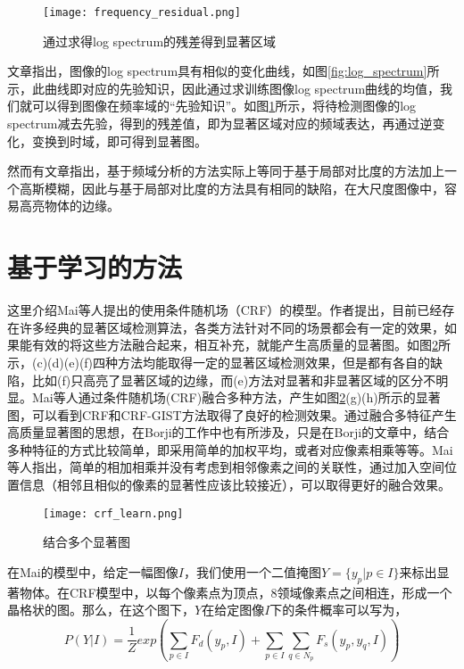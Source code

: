 \begin{figure}[t]
\centering
\texttt{[image: frequency\_residual.png]}
\caption{通过求得log spectrum的残差得到显著区域}\label{fig:frequency_residual}
\end{figure}

文章指出，图像的log spectrum具有相似的变化曲线，如图\ref{fig:log_spectrum}所示，此曲线即对应的先验知识，因此通过求训练图像log spectrum曲线的均值，我们就可以得到图像在频率域的“先验知识”。如图\ref{fig:frequency_residual}所示，将待检测图像的log spectrum减去先验，得到的残差值，即为显著区域对应的频域表达，再通过逆变化，变换到时域，即可得到显著图。

然而有文章\cite{hou2012image}指出，基于频域分析的方法实际上等同于基于局部对比度的方法加上一个高斯模糊，因此与基于局部对比度的方法具有相同的缺陷，在大尺度图像中，容易高亮物体的边缘。

\section{基于学习的方法}
这里介绍Mai等人\cite{maisaliency}提出的使用条件随机场（CRF）的模型。作者提出，目前已经存在许多经典的显著区域检测算法，各类方法针对不同的场景都会有一定的效果，如果能有效的将这些方法融合起来，相互补充，就能产生高质量的显著图。如图\ref{fig:crf_learn}所示，(c)(d)(e)(f)四种方法均能取得一定的显著区域检测效果，但是都有各自的缺陷，比如(f)只高亮了显著区域的边缘，而(e)方法对显著和非显著区域的区分不明显。Mai等人通过条件随机场(CRF)融合多种方法，产生如图\ref{fig:crf_learn}(g)(h)所示的显著图，可以看到CRF和CRF-GIST方法取得了良好的检测效果。通过融合多特征产生高质量显著图的思想，在Borji的工作中\cite{borji2012salient}也有所涉及，只是在Borji的文章中，结合多种特征的方式比较简单，即采用简单的加权平均，或者对应像素相乘等等。Mai等人指出\cite{maisaliency}，简单的相加相乘并没有考虑到相邻像素之间的关联性，通过加入空间位置信息（相邻且相似的像素的显著性应该比较接近），可以取得更好的融合效果。

\begin{figure}[h]
\centering
\texttt{[image: crf\_learn.png]}
\caption{结合多个显著图}\label{fig:crf_learn}
\end{figure}

在Mai的模型中，给定一幅图像$I$，我们使用一个二值掩图$Y=\{y_p|p\in I\}$来标出显著物体。在CRF模型中，以每个像素点为顶点，8领域像素点之间相连，形成一个晶格状的图。那么，在这个图下，$Y$在给定图像$I$下的条件概率可以写为，
\begin{equation}
P(Y|I) = \frac{1}{Z}exp(\sum_{p\in I}F_d(y_p, I) + \sum_{p\in I}\sum_{q\in N_p}F_s(y_p,y_q,I) )
\end{equation}


